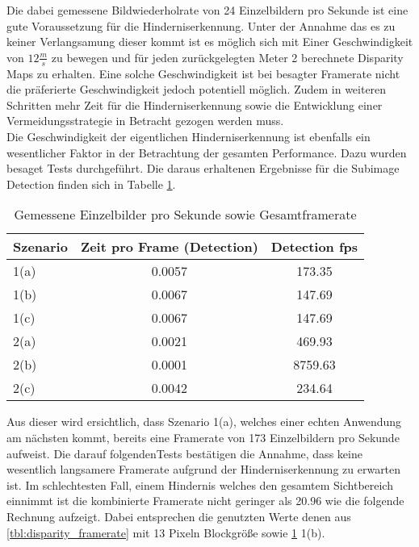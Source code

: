 \noindent
Die dabei gemessene Bildwiederholrate von 24 Einzelbildern pro Sekunde ist eine gute Voraussetzung für die Hinderniserkennung. Unter der Annahme das es zu keiner Verlangsamung dieser kommt ist es möglich sich mit Einer Geschwindigkeit von $12\frac{m}{s}$ zu bewegen und für jeden zurückgelegten Meter 2 berechnete Disparity Maps zu erhalten. Eine solche Geschwindigkeit ist bei besagter Framerate nicht die präferierte Geschwindigkeit jedoch potentiell möglich. Zudem in weiteren Schritten mehr Zeit für die Hinderniserkennung sowie die Entwicklung einer Vermeidungsstrategie in Betracht gezogen werden muss.\\

\noindent
Die Geschwindigkeit der eigentlichen Hinderniserkennung ist ebenfalls ein wesentlicher Faktor in der Betrachtung der gesamten Performance. Dazu wurden besaget Tests durchgeführt. Die daraus erhaltenen Ergebnisse für die Subimage Detection finden sich in Tabelle \ref{tbl:subimage_framerate}.

\begin{table}[h]
\centering
\begin{tabular}{|l|c|c|}
\hline
Szenario & Zeit pro Frame (Detection) & Detection fps \\ \hline\hline
1(a)     & 0.0057                     & 173.35        \\ \hline
1(b)     & 0.0067                     & 147.69        \\ \hline
1(c)     & 0.0067                     & 147.69        \\ \hline\hline
2(a)     & 0.0021                     & 469.93        \\ \hline
2(b)     & 0.0001                     & 8759.63       \\ \hline
2(c)     & 0.0042                     & 234.64        \\ \hline
\end{tabular}
\caption{Gemessene Einzelbilder pro Sekunde sowie Gesamtframerate}
\label{tbl:subimage_framerate}
\end{table}

\noindent
Aus dieser wird ersichtlich, dass Szenario 1(a), welches einer echten Anwendung am nächsten kommt, bereits eine Framerate von 173 Einzelbildern pro Sekunde aufweist. Die darauf folgendenTests bestätigen die Annahme, dass keine wesentlich langsamere Framerate aufgrund der Hinderniserkennung zu erwarten ist. Im schlechtesten Fall, einem Hindernis welches den gesamtem Sichtbereich einnimmt ist die kombinierte Framerate nicht geringer als 20.96 wie die folgende Rechnung aufzeigt. Dabei entsprechen die genutzten Werte denen aus \ref{tbl:disparity_framerate} mit 13 Pixeln Blockgröße sowie \ref{tbl:subimage_framerate} 1(b). 

